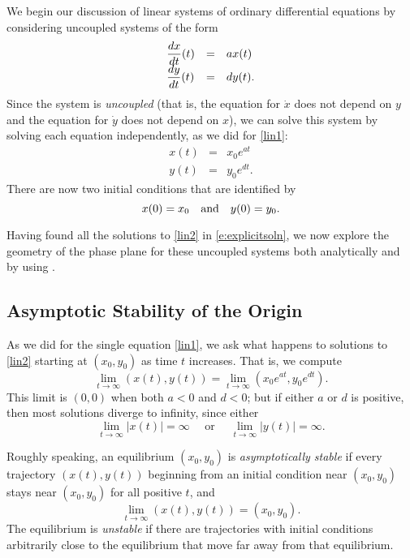 \documentclass{ximera}
\begin{document}
We begin our discussion of linear systems of ordinary
differential equations by considering uncoupled
systems of the form
\renewcommand{\arraystretch}{1.8}
\begin{equation} \label{lin2}
\begin{array}{lll}
\displaystyle \frac{dx}{dt}(t) & = & a x(t) \\
\displaystyle \frac{dy}{dt}(t) & = & d y(t).
\end{array}
\end{equation}
\renewcommand{\arraystretch}{1.0}%
Since the system is {\em uncoupled\/} (that is, the equation for
$\dot{x}$ does not depend on $y$ and the equation for $\dot{y}$
does not depend on $x$), we can solve this system by solving each
equation independently, as we did for \eqref{lin1}:
\begin{equation} \label{e:explicitsoln}
\begin{array}{ccc}
x(t) & = & x_0e^{at} \\
y(t) & = & y_0e^{dt}.
\end{array}
\end{equation}
There are now two initial conditions that are identified by
\[
x(0) = x_0 \quad\mbox{and}\quad y(0) = y_0.
\]

Having found all the solutions to \eqref{lin2} in \eqref{e:explicitsoln},
we now explore the geometry of the phase plane for
these uncoupled systems both analytically and by using \Matlabp.


\subsection*{Asymptotic Stability of the Origin}

As we did for the single equation \eqref{lin1}, we ask
what happens to solutions to \eqref{lin2} starting at $(x_0,y_0)$ as
time $t$ increases.  That is, we compute
\[
\lim_{t\to\infty}(x(t),y(t))=\lim_{t\to\infty}(x_0e^{a t},y_0e^{d t}).
\]
This limit is $(0,0)$ when both $a<0$ and $d<0$; but
if either $a$ or $d$ is positive, then most solutions diverge
to infinity, since either
\[
\lim_{t\to\infty}|x(t)| =\infty \quad \mbox{ or } \quad
\lim_{t\to\infty}|y(t)| =\infty.
\]


Roughly speaking, an equilibrium  $(x_0,y_0)$ is 
{\em asymptotically stable\/}  if every 
trajectory $(x(t),y(t))$ beginning from an initial condition near 
$(x_0,y_0)$ stays near $(x_0,y_0)$ for all positive $t$, and
\[
\lim_{t\to\infty}(x(t),y(t)) = (x_0,y_0).
\]
The equilibrium is {\em unstable\/}  if there are  
trajectories with initial conditions arbitrarily close to the 
equilibrium that move far away from that equilibrium.
\end{document}
